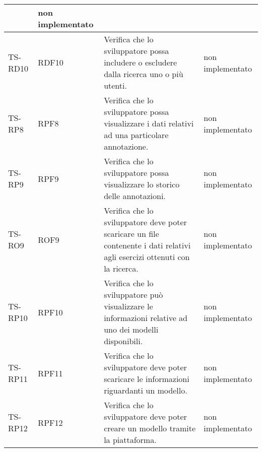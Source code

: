 {\begin{longtable}{|>{\centering\arraybackslash}m{1.6cm}|>{\centering\arraybackslash}m{1.7cm}|m{6.41cm}|>{\centering\arraybackslash}m{3.1cm}|}
		& non implementato\\ \hline
		\rowcolor{LightGray}
		TS-RD10		
		& RDF10 
		& Verifica che lo sviluppatore possa includere o escludere dalla ricerca uno o più utenti. 
		& non implementato\\ \hline 
		\rowcolor{white}
		TS-RP8		
		& RPF8 
		& Verifica che lo sviluppatore possa visualizzare i dati relativi ad una particolare annotazione. 		
		& non implementato\\ \hline
		\rowcolor{LightGray}
		TS-RP9		
		& RPF9 
		& Verifica che lo sviluppatore possa visualizzare lo storico delle annotazioni. 
		&  non implementato\\ \hline
		\rowcolor{white}
		TS-RO9
		& ROF9 
		& Verifica che lo sviluppatore deve poter scaricare un file contenente i dati relativi agli esercizi ottenuti con la ricerca.
		& non implementato\\ \hline
		\rowcolor{LightGray}
		TS-RP10		
		& RPF10 
		& Verifica che lo sviluppatore può visualizzare le informazioni relative ad uno dei modelli disponibili. 
		& non implementato\\ \hline
		\rowcolor{white}
		TS-RP11		
		& RPF11 
		& Verifica che lo sviluppatore deve poter scaricare le informazioni riguardanti un modello. 
		& non implementato\\ \hline
		\rowcolor{LightGray}
		TS-RP12		
		& RPF12 
		& Verifica che lo sviluppatore deve poter creare un modello tramite la piattaforma. 
		& non implementato\\ \hline	
		

\end{longtable}}

